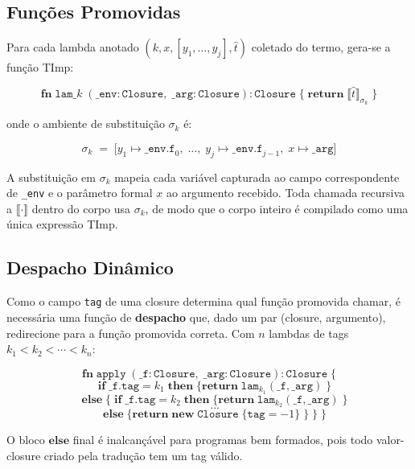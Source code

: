 \subsection{Funções Promovidas}

Para cada lambda anotado \((k, x, [y_1,\ldots,y_j], \hat{t})\) coletado
do termo, gera-se a função TImp:

\[
  \mathbf{fn}\;\mathtt{lam}\_k\;
  (\mathtt{\_env} : \mathtt{Closure},\;
  \mathtt{\_arg} : \mathtt{Closure}) :
  \mathtt{Closure}\;\{
    \;\mathbf{return}\;
  \llbracket \hat{t} \rrbracket_{\sigma_k}\;\}
\]

onde o ambiente de substituição \(\sigma_k\) é:

\[
  \sigma_k \;=\;
  \bigl[y_1 \mapsto \mathtt{\_env.f}_0,\;\ldots,\;
    y_j \mapsto \mathtt{\_env.f}_{j-1},\;
  x \mapsto \mathtt{\_arg}\bigr]
\]

A substituição em \(\sigma_k\) mapeia cada variável capturada ao
campo correspondente de \texttt{\_env} e o parâmetro formal \(x\) ao
argumento recebido. Toda chamada recursiva a \(\llbracket \cdot
\rrbracket\) dentro do corpo usa \(\sigma_k\), de modo que o corpo
inteiro é compilado como uma única expressão TImp.

\subsection{Despacho Dinâmico}

Como o campo \texttt{tag} de uma closure determina qual função promovida
chamar, é necessária uma função de \textbf{despacho} que, dado um par
(closure, argumento), redirecione para a função promovida correta. Com
\(n\) lambdas de tags \(k_1 < k_2 < \cdots < k_n\):

\[
  \mathbf{fn}\;\mathtt{apply}\;
  (\mathtt{\_f} : \mathtt{Closure},\;
  \mathtt{\_arg} : \mathtt{Closure}) :
  \mathtt{Closure}\;\{
  \]
  \[
    \quad \mathbf{if}\;\mathtt{\_f.tag} = k_1\;
    \mathbf{then}\;\{\mathbf{return}\;\mathtt{lam}_{k_1}(\mathtt{\_f},
    \mathtt{\_arg})\;\}
  \]
  \[
    \quad \mathbf{else}\;\{\;\mathbf{if}\;\mathtt{\_f.tag} =
      k_2\;\mathbf{then}\;
      \{\mathbf{return}\;\mathtt{lam}_{k_2}(\mathtt{\_f}, \mathtt{\_arg})\;\}
    \]
    \[
      \quad \ldots
    \]
    \[
      \quad\mathbf{else}\;\{\mathbf{return}\;
  \mathbf{new}\;\mathtt{Closure}\;\{\mathtt{tag} = {-1}\}\;\}\;\}\;\}
\]

O bloco \(\mathbf{else}\) final é inalcançável para programas bem
formados, pois todo valor-closure criado pela tradução tem um tag
válido.

